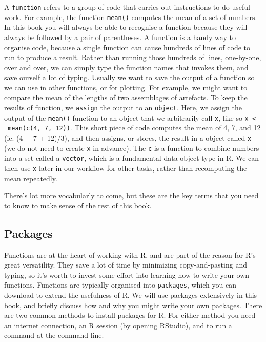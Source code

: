 \documentclass[]{book}
\begin{document}
A \texttt{function} refers to a group of code that carries out
instructions to do useful work. For example, the function
\texttt{mean()} computes the mean of a set of numbers. In this book you
will always be able to recognise a function because they will always be
followed by a pair of parentheses. A function is a handy way to organise
code, because a single function can cause hundreds of lines of code to
run to produce a result. Rather than running those hundreds of lines,
one-by-one, over and over, we can simply type the function names that
invokes them, and save ourself a lot of typing. Usually we want to save
the output of a function so we can use in other functions, or for
plotting. For example, we might want to compare the mean of the lengths
of two assemblages of artefacts. To keep the results of function, we
\texttt{assign} the output to an \texttt{object}. Here, we assign the
output of the \texttt{mean()} function to an object that we arbitrarily
call \texttt{x}, like so \texttt{x\ \textless{}-\ mean(c(4,\ 7,\ 12))}.
This short piece of code computes the mean of 4, 7, and 12 (ie. (4 + 7 +
12)/3), and then assigns, or stores, the result in a object called
\texttt{x} (we do not need to create \texttt{x} in advance). The
\texttt{c} is a function to combine numbers into a set called a
\texttt{vector}, which is a fundamental data object type in R. We can
then use \texttt{x} later in our workflow for other tasks, rather than
recomputing the mean repeatedly.

There's lot more vocabularly to come, but these are the key terms that
you need to know to make sense of the rest of this book.

\subsection{Packages}\label{packages}

Functions are at the heart of working with R, and are part of the reason
for R's great versatility. They save a lot of time by minimizing
copy-and-pasting and typing, so it's worth to invest some effort into
learning how to write your own functions. Functions are typically
organised into \texttt{packages}, which you can download to extend the
usefulness of R. We will use packages extensively in this book, and
briefly discuss how and why you might write your own packages. There are
two common methods to install packages for R. For either method you need
an internet connection, an R session (by opening RStudio), and to run a
command at the command line.
\end{document}
